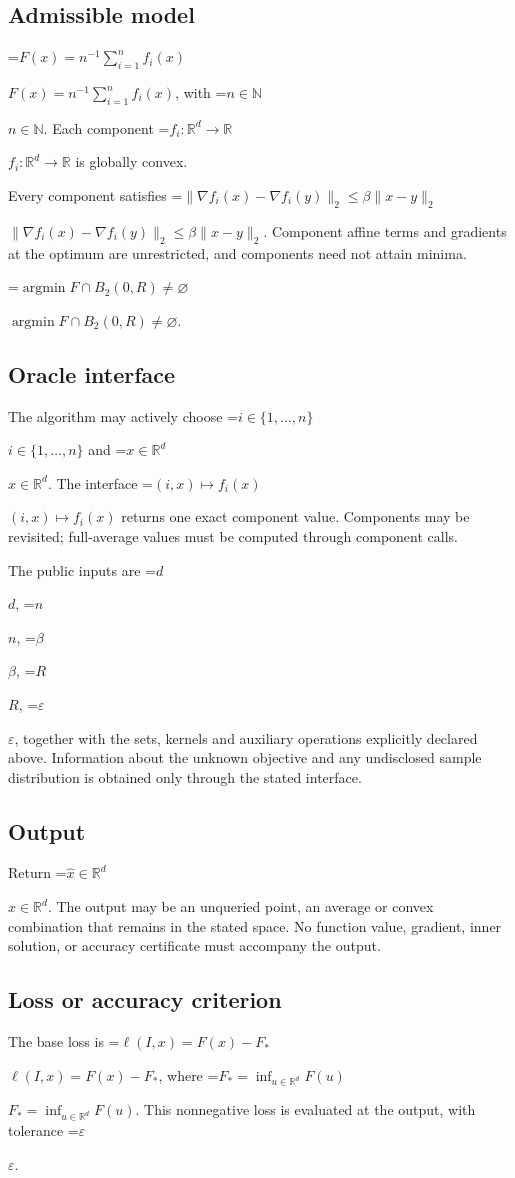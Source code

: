 \documentclass[10pt,a4paper]{article}
\newcommand{\AtlasMath}[1]{\par\begingroup\centering\setbox0=\hbox{$\displaystyle #1$}\ifdim\wd0>1.4\linewidth\typeout{ATLAS WIDE FORMULA: \the\wd0}\fi\ifdim\wd0>\linewidth\resizebox{\linewidth}{!}{\box0}\else\box0\fi\par\endgroup}
\newcommand{\AtlasInlineMath}[1]{\begingroup\setbox0=\hbox{$#1$}\ifdim\wd0>.4\linewidth\endgroup\AtlasMath{#1}\else\endgroup$#1$\fi}
\begin{document}
\subsection{Admissible model}
\AtlasInlineMath{F(x)=n^{-1}\sum_{i=1}^n f_i(x)}, with \AtlasInlineMath{n\in\mathbb{N}}. Each component \AtlasInlineMath{f_i:\mathbb{R}^d\to\mathbb{R}} is globally convex.

Every component satisfies \AtlasInlineMath{\|\nabla f_i(x)-\nabla f_i(y)\|_2\le\beta\|x-y\|_2}. Component affine terms and gradients at the optimum are unrestricted, and components need not attain minima.

\AtlasInlineMath{\operatorname{argmin}F\cap B_2(0,R)\ne\varnothing}.

\subsection{Oracle interface}
The algorithm may actively choose \AtlasInlineMath{i\in\{1,\ldots,n\}} and \AtlasInlineMath{x\in\mathbb{R}^d}. The interface \AtlasInlineMath{(i,x)\mapsto f_i(x)} returns one exact component value. Components may be revisited; full-average values must be computed through component calls.

The public inputs are \AtlasInlineMath{d}, \AtlasInlineMath{n}, \AtlasInlineMath{\beta}, \AtlasInlineMath{R}, \AtlasInlineMath{\varepsilon}, together with the sets, kernels and auxiliary operations explicitly declared above. Information about the unknown objective and any undisclosed sample distribution is obtained only through the stated interface.

\subsection{Output}
Return \AtlasInlineMath{\widehat{x}\in \mathbb{R}^d}. The output may be an unqueried point, an average or convex combination that remains in the stated space. No function value, gradient, inner solution, or accuracy certificate must accompany the output.

\subsection{Loss or accuracy criterion}
The base loss is \AtlasInlineMath{\ell(I,x)=F(x)-F_*}, where \AtlasInlineMath{F_*=\inf_{u\in \mathbb{R}^d}F(u)}. This nonnegative loss is evaluated at the output, with tolerance \AtlasInlineMath{\varepsilon}.
\end{document}
